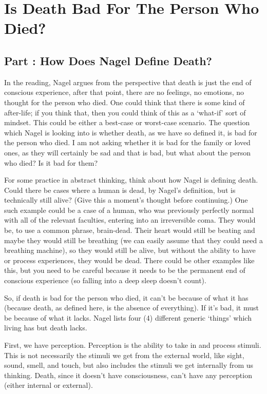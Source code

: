 \part{Is Death Bad For The Person Who Died?}
\label{ch.modtwo}

\chapter{Part \thechapcount: How Does Nagel Define Death?}\setcounter{seccount}{1}
In the reading, Nagel argues from the perspective that death is just the end of conscious experience, after that point, there are no feelings, no emotions, no thought for the person who died. One could think that there is some kind of after-life; if you think that, then you could think of this as a ‘what-if’ sort of mindset. This could be either a best-case or worst-case scenario. The question which Nagel is looking into is whether death, as we have so defined it, is bad for the person who died. I am not asking whether it is bad for the family or loved ones, as they will certainly be sad and that is bad, but what about the person who died? Is it bad for them?

For some practice in abstract thinking, think about how Nagel is defining death. Could there be cases where a human is dead, by Nagel's definition, but is technically still alive? (Give this a moment's thought before continuing.) One such example could be a case of a human, who was previously perfectly normal with all of the relevant faculties, entering into an irreversible coma. They would be, to use a common phrase, brain-dead. Their heart would still be beating and maybe they would still be breathing (we can easily assume that they could need a breathing machine), so they would still be alive, but without the ability to have or process experiences, they would be dead. There could be other examples like this, but you need to be careful because it needs to be the permanent end of conscious experience (so falling into a deep sleep doesn't count).  

So, if death is bad for the person who died, it can't be because of what it has (because death, as defined here, is the absence of everything). If it's bad, it must be because of what it lacks. Nagel lists four (4) different generic `things' which living has but death lacks. 

First, we have perception. Perception is the ability to take in and process stimuli. This is not necessarily the stimuli we get from the external world, like sight, sound, smell, and touch, but also includes the stimuli we get internally from us thinking. Death, since it doesn't have consciousness, can't have any perception (either internal or external). 

